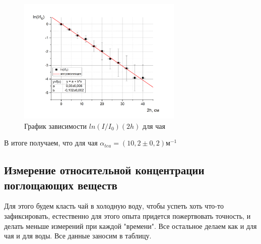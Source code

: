 \documentclass[a4paper, 12pt]{article}%
\begin{document}
\begin{figure}[h]
\begin{center}
\includegraphics[width = 0.7\textwidth]{2.jpg}
\caption{График зависимости $ln(I/I_0) (2h)$ для чая }
\end{center}
\end{figure}

В итоге получаем, что для чая $\alpha_{tea} = (10,2 \pm 0,2)\text{м}^{-1}$
\newpage
\subsection*{Измерение относительной концентрации поглощающих веществ}
Для этого будем класть чай в холодную воду, чтобы успеть хоть что-то зафиксировать, естественно для этого опыта придется пожертвовать точность, и делать меньше измерений при каждой "времени". Все остальное делаем как и для чая и для воды. Все данные заносим в таблицу. 
\end{document}
